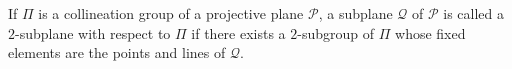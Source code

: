 If $\Pi$ is a collineation group of a projective plane $\mathcal{P}$, a subplane $\mathcal{Q}$ of $\mathcal{P}$ is called a $2$-subplane with respect to $\Pi$ if there exists a $2$-subgroup of $\Pi$ whose fixed elements are the points and lines of $\mathcal{Q}$.
